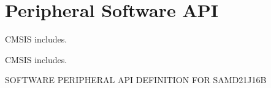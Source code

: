 \hypertarget{group___s_a_m_d21_j16_b__api}{}\section{Peripheral Software A\+PI}
\label{group___s_a_m_d21_j16_b__api}


C\+M\+S\+IS includes.  


C\+M\+S\+IS includes. 

S\+O\+F\+T\+W\+A\+RE P\+E\+R\+I\+P\+H\+E\+R\+AL A\+PI D\+E\+F\+I\+N\+I\+T\+I\+ON F\+OR S\+A\+M\+D21\+J16B 